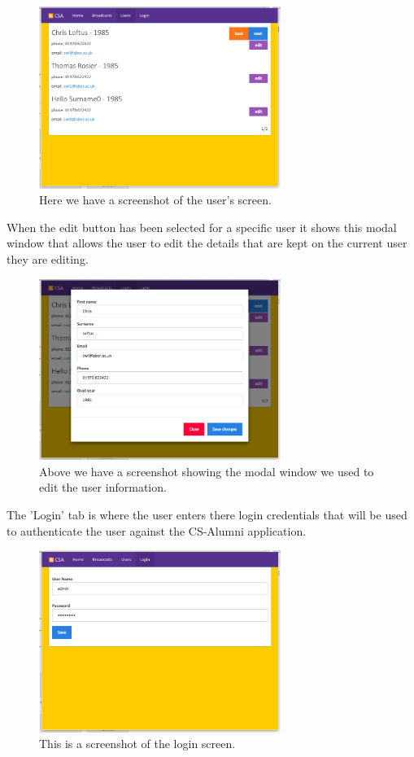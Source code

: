 \documentclass{article}
\begin{document}
\begin{figure}[H]
\centering
\includegraphics[width=0.7\textwidth]{userpage}
\caption{Here we have a screenshot of the user's screen.}
\end{figure}

When the edit button has been selected for a specific user it shows this modal window that allows the user to edit the details that are kept on the current user they are editing.

\begin{figure}[H]
\centering
\includegraphics[width=0.7\textwidth]{modalpage}
\caption{Above we have a screenshot showing the modal window we used to edit the user information.}
\end{figure}

\newpage
The 'Login' tab is where the user enters there login credentials that will be used to authenticate the user against the CS-Alumni application.

\begin{figure}[H]
\centering
\includegraphics[width=0.7\textwidth]{loginpage}
\caption{This is a screenshot of the login screen.}
\end{figure}
\end{document}
